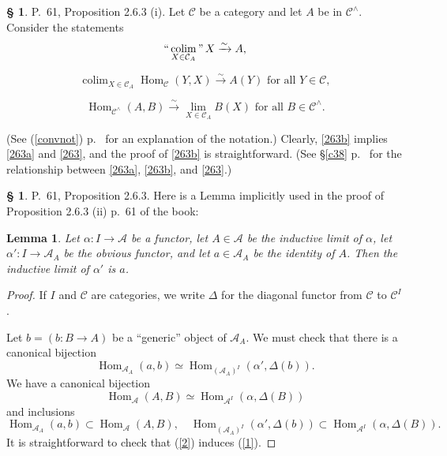 \documentclass[12pt]{article}
\newtheorem{lem}[thm]{Lemma}
\theoremstyle{remark}
\theoremstyle{definition}
\newtheorem{s}[thm]{\S}
\newcommand{\A}{\mathcal A}
\newcommand{\C}{\mathcal C}
\newcommand{\cn}{(See (\ref{convnot}) p.~\pageref{convnot} for an explanation of the notation.) }%
\DeclareMathOperator*{\coli}{colim}
\DeclareMathOperator*{\co}{colim}
\DeclareMathOperator*{\ic}{``\coli"}
\DeclareMathOperator{\Hom}{Hom}%
\begin{document}
\begin{s} 
P.~61, Proposition 2.6.3 (i). Let $\C$ be a category and let $A$ be in $\C^\wedge$. Consider the statements
%
\begin{equation}\label{263a}
\ic_{X\in\C_A}X\xrightarrow\sim A,
\end{equation} 

\begin{equation}\label{263b}
\co_{X\in\C_A}\Hom_\C(Y,X)\xrightarrow\sim A(Y)\text{ for all }Y\in\C, 
\end{equation}

\begin{equation}\label{263} 
\Hom_{\C^\wedge}(A,B)\xrightarrow\sim\lim_{X\in\C_A}B(X)\text{ for all }B\in\C^\wedge. 
\end{equation} 

\noindent\cn Clearly, \eqref{263b} implies \eqref{263a} and \eqref{263}, and the proof of \eqref{263b} is straightforward. (See \S\ref{c38} p.~\pageref{c38} for the relationship between \eqref{263a}, \eqref{263b}, and \eqref{263}.)
\end{s}
%
%
\begin{s} 
P.~61, Proposition 2.6.3. Here is a Lemma implicitly used in the proof of Proposition 2.6.3 (ii) p.~61 of the book: 
%
\begin{lem} 
Let $\alpha:I\to\A$ be a functor, let $A\in\A$ be the inductive limit of $\alpha$, let $\alpha':I\to\A_A$ be the obvious functor, and let $a\in\A_A$ be the identity of $A$. Then the inductive limit of $\alpha'$ is $a$. 
\end{lem} 
%
\begin{proof}
If $I$ and $\C$ are categories, we write $\Delta$ for the diagonal functor from $\C$ to $\C^I$. 

Let $b=(b:B\to A)$ be a ``generic'' object of $\A_A$. We must check that there is a canonical bijection
%
\begin{equation}\label{1}
\Hom_{\A_A}(a,b)\simeq\Hom_{(\A_A)^I}(\alpha',\Delta(b)).
\end{equation}
%
We have a canonical bijection
%
\begin{equation}\label{2}
\Hom_\A(A,B)\simeq\Hom_{\A^I}(\alpha,\Delta(B))
\end{equation}
%
and inclusions 
$$
\Hom_{\A_A}(a,b)\subset\Hom_\A(A,B),\quad
%
\Hom_{(\A_A)^I}(\alpha',\Delta(b))\subset\Hom_{\A^I}(\alpha,\Delta(B)).
$$
It is straightforward to check that (\ref{2}) induces (\ref{1}).
\end{proof}
\end{s}
\end{document}
